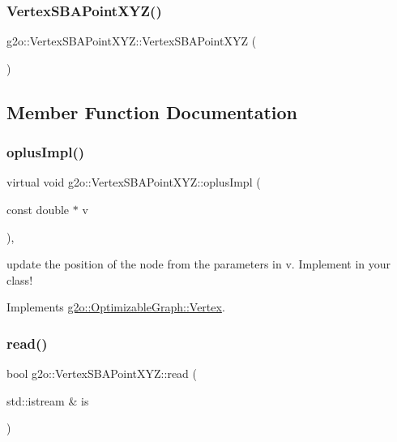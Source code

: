 \subsubsection{\texorpdfstring{Vertex\+S\+B\+A\+Point\+X\+Y\+Z()}{VertexSBAPointXYZ()}}
{\footnotesize\ttfamily g2o\+::\+Vertex\+S\+B\+A\+Point\+X\+Y\+Z\+::\+Vertex\+S\+B\+A\+Point\+X\+YZ (\begin{DoxyParamCaption}{ }\end{DoxyParamCaption})}



\subsection{Member Function Documentation}
\mbox{\label{classg2o_1_1_vertex_s_b_a_point_x_y_z_aa2a13838edc46ed5395fee5c07c4c8ea}} 
\subsubsection{\texorpdfstring{oplus\+Impl()}{oplusImpl()}}
{\footnotesize\ttfamily virtual void g2o\+::\+Vertex\+S\+B\+A\+Point\+X\+Y\+Z\+::oplus\+Impl (\begin{DoxyParamCaption}\item[{const double $\ast$}]{v }\end{DoxyParamCaption})\hspace{0.3cm}{\ttfamily [inline]}, {\ttfamily [virtual]}}

update the position of the node from the parameters in v. Implement in your class! 

Implements \mbox{\hyperlink{classg2o_1_1_optimizable_graph_1_1_vertex_a4537a46afb8d12c3f18c88ba9601c625}{g2o\+::\+Optimizable\+Graph\+::\+Vertex}}.

\mbox{\label{classg2o_1_1_vertex_s_b_a_point_x_y_z_a3668aa23ed3fc7e2c3e6bddda7ddcd1a}} 
\subsubsection{\texorpdfstring{read()}{read()}}
{\footnotesize\ttfamily bool g2o\+::\+Vertex\+S\+B\+A\+Point\+X\+Y\+Z\+::read (\begin{DoxyParamCaption}\item[{std\+::istream \&}]{is }\end{DoxyParamCaption})\hspace{0.3cm}{\ttfamily [virtual]}}



